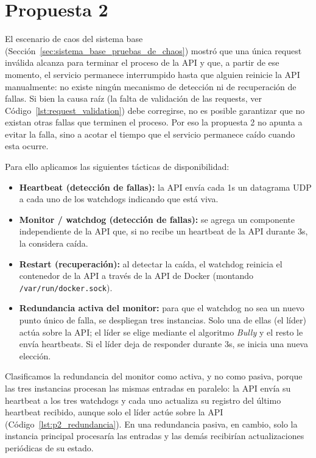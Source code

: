 \section{Propuesta 2}
\label{sec:propuesta_2}

    El escenario de caos del sistema base (Sección~\ref{sec:sistema_base_pruebas_de_chaos}) mostró que una única request inválida
    alcanza para terminar el proceso de la API y que, a partir de ese momento, el servicio permanece interrumpido hasta
    que alguien reinicie la API manualmente: no existe ningún mecanismo de detección ni de recuperación de fallas.
    Si bien la causa raíz (la falta de validación de las requests, ver Código~\ref{lst:request_validation}) debe corregirse, no es posible garantizar que no existan
    otras fallas que terminen el proceso. Por eso la propuesta 2 no apunta a evitar la falla, sino a acotar el tiempo que el
    servicio permanece caído cuando esta ocurre.

    Para ello aplicamos las siguientes tácticas de disponibilidad:

    \begin{itemize}
        \item \textbf{Heartbeat (detección de fallas):} la API envía cada 1s un datagrama UDP a cada uno de los watchdogs indicando que está viva.
        \item \textbf{Monitor / watchdog (detección de fallas):} se agrega un componente independiente de la API que, si no recibe un heartbeat de la API durante 3s, la considera caída.
        \item \textbf{Restart (recuperación):} al detectar la caída, el watchdog reinicia el contenedor de la API a través de la API de Docker (montando \texttt{/var/run/docker.sock}).
        \item \textbf{Redundancia activa del monitor:} para que el watchdog no sea un nuevo punto único de falla, se despliegan tres instancias. Solo una de ellas (el líder) actúa sobre la API; el líder se elige mediante el algoritmo \textit{Bully} y el resto le envía heartbeats. Si el líder deja de responder durante 3s, se inicia una nueva elección.
    \end{itemize}

    Clasificamos la redundancia del monitor como activa, y no como pasiva, porque las tres instancias procesan las mismas
    entradas en paralelo: la API envía su heartbeat a los tres watchdogs y cada uno actualiza su registro del último
    heartbeat recibido, aunque solo el líder actúe sobre la API (Código~\ref{lst:p2_redundancia}). En una redundancia pasiva,
    en cambio, solo la instancia principal procesaría las entradas y las demás recibirían actualizaciones periódicas de su
    estado.

